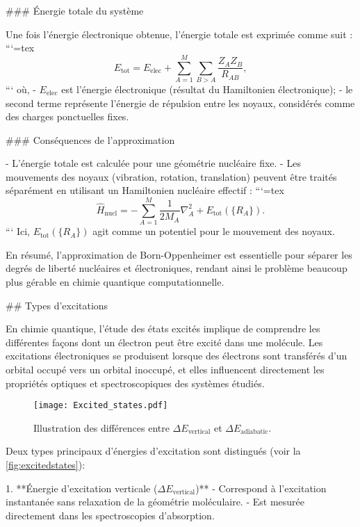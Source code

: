 \documentclass[12pt,a4paper]{report}
\begin{document}
\begin{markdown}
### Énergie totale du système

Une fois l'énergie électronique obtenue, l'énergie totale est exprimée comme suit :
```{=tex}
\begin{equation}
E_{\text{tot}} = E_{\text{elec}} + \sum_{A=1}^M \sum_{B>A} \frac{Z_A Z_B}{R_{AB}},
\end{equation}
```
où,
- $E_{\text{elec}}$ est l'énergie électronique (résultat du Hamiltonien électronique);
- le second terme représente l'énergie de répulsion entre les noyaux, considérés comme des charges ponctuelles fixes.

### Conséquences de l'approximation

- L'énergie totale est calculée pour une géométrie nucléaire fixe.
- Les mouvements des noyaux (vibration, rotation, translation) peuvent être traités séparément en utilisant un Hamiltonien nucléaire effectif :
```{=tex}
\begin{equation}
\hat{H}_{\text{nucl}} = -\sum_{A=1}^M \frac{1}{2M_A} \nabla_A^2 + E_{\text{tot}}(\{R_A\}) .
\end{equation}
```
Ici, $E_{\text{tot}}(\{R_A\})$ agit comme un potentiel pour le mouvement des noyaux.

En résumé, l'approximation de Born-Oppenheimer est essentielle pour séparer les degrés de liberté nucléaires et électroniques, rendant ainsi le problème beaucoup plus gérable en chimie quantique computationnelle.


## Types d'excitations

En chimie quantique, l'étude des états excités implique de comprendre les différentes façons dont un électron peut être excité dans une molécule. Les excitations électroniques se produisent lorsque des électrons sont transférés d'un orbital occupé vers un orbital inoccupé, et elles influencent directement les propriétés optiques et spectroscopiques des systèmes étudiés.

\begin{figure}[htpb]
\centering
\texttt{[image: Excited\_states.pdf]}
\caption{Illustration des différences entre $\Delta E_{\text{vertical}}$ et $\Delta E_{\text{adiabatic}}$.}
\label{fig:excitedstates}
\end{figure}

Deux types principaux d'énergies d'excitation sont distingués (voir la \autoref{fig:excitedstates}):

1. **Énergie d'excitation verticale ($ \Delta E_{\text{vertical}} $)**
   - Correspond à l'excitation instantanée sans relaxation de la géométrie moléculaire.
   - Est mesurée directement dans les spectroscopies d'absorption.


\end{markdown}
\end{document}
